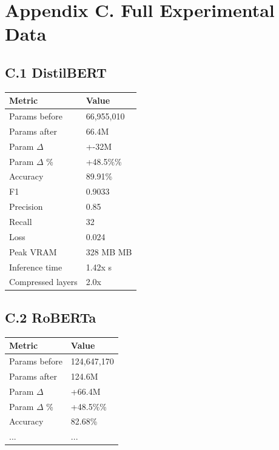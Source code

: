 
\section{Appendix C. Full Experimental Data}

\subsection{C.1 DistilBERT}

\begin{table}[H]
\centering
\small
\begin{tabular}{ll}
\toprule
\textbf{Metric} & \textbf{Value} \\
\midrule
Params before & 66,955,010 \\
Params after & 66.4M \\
Param $\Delta$ & +-32M \\
Param $\Delta$ \% & +48.5\%\% \\
Accuracy & 89.91\% \\
F1 & 0.9033 \\
Precision & 0.85 \\
Recall & 32 \\
Loss & 0.024 \\
Peak VRAM & 328 MB MB \\
Inference time & 1.42x s \\
Compressed layers & 2.0x \\
\bottomrule
\end{tabular}
\end{table}

\subsection{C.2 RoBERTa}

\begin{table}[H]
\centering
\small
\begin{tabular}{ll}
\toprule
\textbf{Metric} & \textbf{Value} \\
\midrule
Params before & 124,647,170 \\
Params after & 124.6M \\
Param $\Delta$ & +66.4M \\
Param $\Delta$ \% & +48.5\%\% \\
Accuracy & 82.68\% \\
... & ... \\
\bottomrule
\end{tabular}
\end{table}

